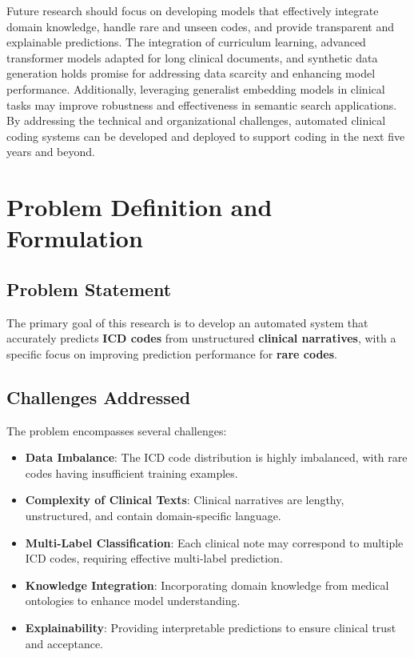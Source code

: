 \documentclass[12pt,a4paper]{report}
\begin{document}
Future research should focus on developing models that effectively integrate domain knowledge, handle rare and unseen codes, and provide transparent and explainable predictions. The integration of curriculum learning, advanced transformer models adapted for long clinical documents, and synthetic data generation holds promise for addressing data scarcity and enhancing model performance. Additionally, leveraging generalist embedding models in clinical tasks may improve robustness and effectiveness in semantic search applications. By addressing the technical and organizational challenges, automated clinical coding systems can be developed and deployed to support coding in the next five years and beyond.


\chapter{Problem Definition and Formulation}

\section{Problem Statement}
The primary goal of this research is to develop an automated system that accurately predicts \textbf{ICD codes} from unstructured \textbf{clinical narratives}, with a specific focus on improving prediction performance for \textbf{rare codes}.

\section{Challenges Addressed}
The problem encompasses several challenges:
\begin{itemize}
    \item \textbf{Data Imbalance}: The ICD code distribution is highly imbalanced, with rare codes having insufficient training examples.
    \item \textbf{Complexity of Clinical Texts}: Clinical narratives are lengthy, unstructured, and contain domain-specific language.
    \item \textbf{Multi-Label Classification}: Each clinical note may correspond to multiple ICD codes, requiring effective multi-label prediction.
    \item \textbf{Knowledge Integration}: Incorporating domain knowledge from medical ontologies to enhance model understanding.
    \item \textbf{Explainability}: Providing interpretable predictions to ensure clinical trust and acceptance.
\end{itemize}
\end{document}

